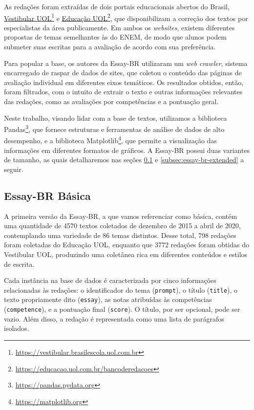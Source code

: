 As redações foram extraídas de dois portais educacionais abertos do Brasil, \href{https://vestibular.brasilescola.uol.com.br/banco-de-redacoes}{Vestibular UOL}\footnote{\url{https://vestibular.brasilescola.uol.com.br}} e \href{https://educacao.uol.com.br/bancoderedacoes}{Educação UOL}\footnote{\url{https://educacao.uol.com.br/bancoderedacoes}}, que disponibilizam a correção dos textos por especialistas da área publicamente. Em ambos os \textit{websites}, existem diferentes propostas de temas semelhantes às do ENEM, de modo que alunos podem submeter suas escritas para a avaliação de acordo com sua preferência.

Para popular a base, os autores da Essay-BR utilizaram um \textit{web crawler}, sistema encarregado de raspar de dados de sites, que coletou o conteúdo das páginas de avaliação individual em diferentes eixos temáticos. Os resultados obtidos, então, foram filtrados, com o intuito de extrair o texto e outras informações relevantes das redações, como as avaliações por competências e a pontuação geral.

Neste trabalho, visando lidar com a base de textos, utilizamos a biblioteca Pandas\footnote{\url{https://pandas.pydata.org}}, que fornece estruturas e ferramentas de análise de dados de alto desempenho, e a biblioteca Matplotlib\footnote{\url{https://matplotlib.org}}, que permite a visualização das informações em diferentes formatos de gráficos. A Essay-BR possui duas variantes de tamanho, as quais detalharemos nas seções \ref{subsec:essay-br-basic} e \ref{subsec:essay-br-extended} a seguir.

\subsection{Essay-BR Básica}
\label{subsec:essay-br-basic}

A primeira versão da Essay-BR, a que vamos referenciar como básica, contém uma quantidade de 4570 textos coletados de dezembro de 2015 a abril de 2020, contemplando uma variedade de 86 temas distintos. Desse total, 798 redações foram coletadas do Educação UOL, enquanto que 3772 redações foram obtidas do Vestibular UOL, produzindo uma coletânea rica em diferentes conteúdos e estilos de escrita.

Cada instância na base de dados é caracterizada por cinco informações relacionadas às redações: o identificador do tema (\texttt{prompt}), o título (\texttt{title}), o texto propriamente dito (\texttt{essay}), as notas atribuídas às competências (\texttt{competence}), e a pontuação final (\texttt{score}). O título, por ser opcional, pode ser vazio. Além disso, a redação é representada como uma lista de parágrafos isolados.


